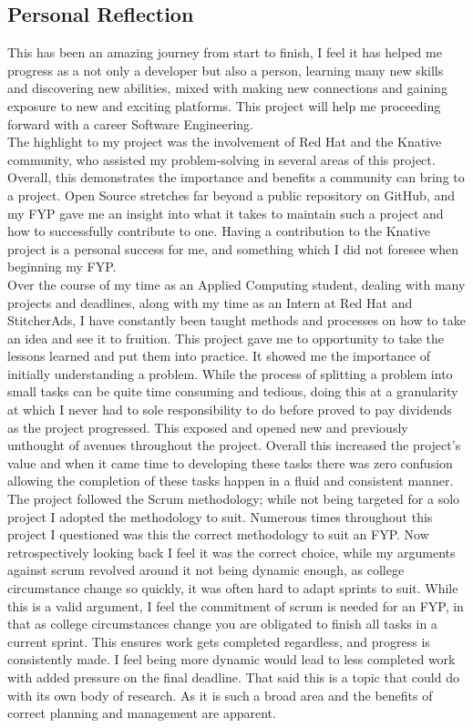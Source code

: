 \subsection{Personal Reflection}
This has been an amazing journey from start to finish, I feel it has helped me progress as a not only a developer but also a person, learning many new skills and discovering new abilities, mixed with making new connections and gaining exposure to new and exciting platforms. This project will help me proceeding forward with a career Software Engineering. 
\\The highlight to my project was the involvement of Red Hat and the Knative community, who assisted my problem-solving in several areas of this project. Overall, this demonstrates the importance and benefits a community can bring to a project. Open Source stretches far beyond a public repository on GitHub, and my FYP gave me an insight into what it takes to maintain such a project and how to successfully contribute to one. Having a contribution to the Knative project is a personal success for me, and something which I did not foresee when beginning my FYP.
\\Over the course of my time as an Applied Computing student, dealing with many projects and deadlines, along with my time as an Intern at Red Hat and StitcherAds, I have constantly been taught methods and processes on how to take an idea and see it to fruition. This project gave me to opportunity to take the lessons learned and put them into practice. It showed me the importance of initially understanding a problem. While the process of splitting a problem into small tasks can be quite time consuming and tedious, doing this at a granularity at which I never had to sole responsibility to do before proved to pay dividends as the project progressed. This exposed and opened new and previously unthought of avenues throughout the project. Overall this increased the project's value and when it came time to developing these tasks there was zero confusion allowing the completion of these tasks happen in a fluid and consistent manner.
\\The project followed the Scrum methodology; while not being targeted for a solo project I adopted the methodology to suit. Numerous times throughout this project I questioned was this the correct methodology to suit an FYP. Now retrospectively looking back I feel it was the correct choice, while my arguments against scrum revolved around it not being dynamic enough, as college circumstance change so quickly, it was often hard to adapt sprints to suit. While this is a valid argument, I feel the commitment of scrum is needed for an FYP, in that as college circumstances change you are obligated to finish all tasks in a current sprint. This ensures work gets completed regardless, and progress is consistently made. I feel being more dynamic would lead to less completed work with added pressure on the final deadline. That said this is a topic that could do with its own body of research. As it is such a broad area and the benefits of correct planning and management are apparent.
